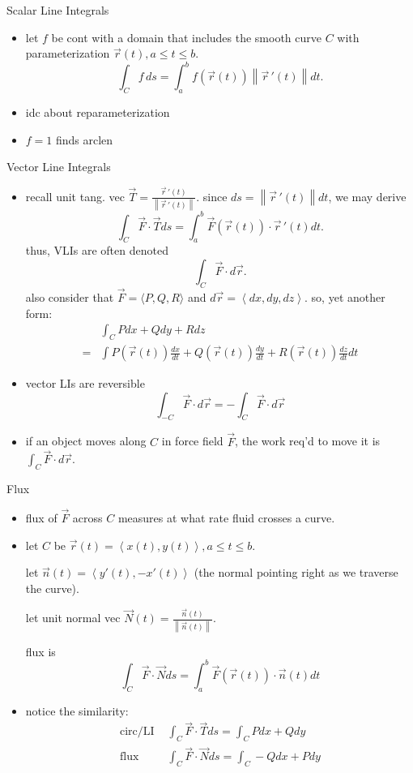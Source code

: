 \documentclass[11pt]{article}
\theoremstyle{definition}
\newcommand{\col}[1]{\begin{minipage}{\columnwidth}#1\end{minipage}}
\newcommand{\magn}[1]{\left\lVert #1 \right\rVert}
\begin{document}
\begin{multicols}{2}
{    Scalar Line Integrals
    \begin{itemize}
      \item let $f$ be cont with a domain that includes the smooth curve $C$ with parameterization $\vec{r}(t), a\le t\le b$.
      \[ \int_C f\, ds = \int_a^b f(\vec{r}(t))\magn{\vec{r}\,'(t)} dt. \]
      \item idc about reparameterization
      \item $f=1$ finds arclen
    \end{itemize}
  }
  \col{
    Vector Line Integrals
    \begin{itemize}
      \item recall unit tang. vec $\vec{T}=\frac{\vec{r}\,'(t)}{\magn{\vec{r}\,'(t)}}$. since $ds=\magn{\vec{r}\,'(t)}dt$, we may derive
      \[ \int_C \vec{F}\cdot\vec{T}ds = \int_a^b \vec{F}(\vec{r}(t))\cdot\vec{r}\,'(t)dt. \]
      thus, VLIs are often denoted
      \[\int_C \vec{F}\cdot d\vec{r}.\]
      also consider that $\vec{F}=\langle P,Q,R \rangle$ and $d\vec{r}=\left<dx,dy,dz\right>$. so, yet another form:
      \begin{align*}
        &\int_C Pdx + Qdy + Rdz\\
        =&\int P(\vec{r}(t)) \frac{dx}{dt} + Q(\vec{r}(t)) \frac{dy}{dt} + R(\vec{r}(t)) \frac{dz}{dt} dt
      \end{align*}
      \item vector LIs are reversible
      \[\int_{-C}\vec{F}\cdot d\vec{r} = -\int_C \vec{F}\cdot d\vec{r}\]
      \item if an object moves along $C$ in force field $\vec{F}$, the work req'd to move it is $\int_C \vec{F}\cdot d\vec{r}$.
    \end{itemize}
    Flux
    \begin{itemize}
      \item flux of $\vec{F}$ across $C$ measures at what rate fluid crosses a curve.
      \item let $C$ be $\vec{r}(t)=\left<x(t),y(t)\right>, a\le t\le b$.
      
      let $\vec{n}(t) = \left<y'(t),-x'(t)\right>$ (the normal pointing right as we traverse the curve).

      let unit normal vec $\vec{N}(t) = \frac{\vec{n}(t)}{\magn{\vec{n}(t)}}$.

      flux is
      \[\int_C \vec{F}\cdot\vec{N}ds = \int_a^b \vec{F}(\vec{r}(t))\cdot \vec{n}(t)dt\]
      \item notice the similarity:
      \begin{align*}
        \text{circ/LI } & \int_C\vec{F}\cdot\vec{T} ds = \int_C Pdx + Qdy\\
        \text{flux } & \int_C\vec{F}\cdot\vec{N} ds = \int_C -Qdx + Pdy\\
      \end{align*}
    \end{itemize}
  }
\end{multicols}
\end{document}
